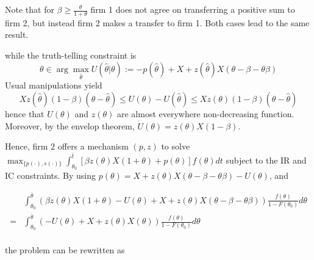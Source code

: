 \documentclass[a4paper]{article}
\renewcommand{\th}{\hat\theta}
\renewcommand{\t}{\theta}
\renewcommand{\b}{\beta}
\begin{document}
Note that for $\b\geq \frac{\t}{1+\t}$ firm 1 does not agree on transferring a positive sum to firm 2, but instead firm 2 makes a transfer to firm 1. Both cases lead to the same result. 

while the truth-telling constraint is
\begin{equation*}
  \t \in \arg\max_{\th} U(\th|\t):=-p(\th)+X+ z(\th)X(\t-\b-\t\b)
\end{equation*}
%
Usual manipulations yield 
%
\[
  X z(\th)(1-\b)(\t-\th)\leq U(\t)-U(\th)\leq Xz(\t)(1-\b)(\t-\th)
\]
%
hence that $U(\t)$ and $z(\t)$ are almost everywhere non-decreasing function. Moreover, by the envelop theorem, $\dot U(\theta)=z(\t)X(1-\b)$. 

Hence, firm $2$ offers a mechanism $(p,z)$ to solve $\max_{\{p(\cdot),s(\cdot)\}}\int_{\t_0}^{\overline t}[\b z(\t)X(1+\t)+p(\t)]f(\t)dt$ subject to the IR and IC constraints. By using $p(\t)=X+z(\t)X(\t-\b-\t\b)-U(\t)$, and 


\begin{equation}
    \begin{aligned}
    &\int_{\t_0}^{\overline \t} \left(\b z(\t)X(1+\t)-U(\t)+X+z(\t)X(\t-\b-\t\b) \right)\frac{f(\t)}{1-F(\t_0)}d\t\\
    =&\int_{\t_0}^{\overline \t} \left(-U(\t)+X+z(\t)X(\t) \right)\frac{f(\t)}{1-F(\t_0)}d\t\\
    \end{aligned}
\end{equation}


the problem can be rewritten as
\end{document}
